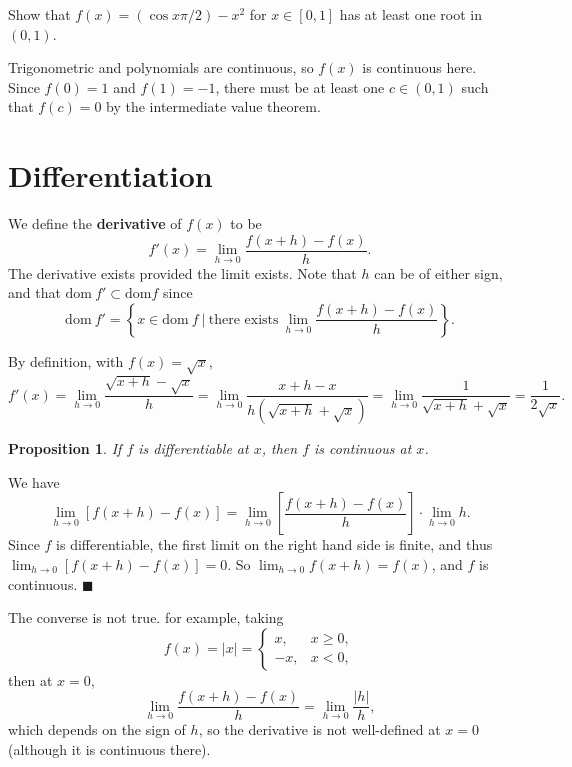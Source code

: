 \documentclass[letter-paper]{tufte-book}
\newtheorem{proposition}[theorem]{\color{pastel-blue}Proposition}
\newenvironment{proof}[1][Proof]{\begin{trivlist}
\item[\hskip \labelsep {\bfseries #1}]}{\end{trivlist}}
\newenvironment{example}[1][Example]{\begin{trivlist}
\item[\hskip \labelsep {\bfseries #1}]}{\end{trivlist}}
\newcommand\Def[1]{\textbf{#1}}
\newcommand{\qed}{\hfill$\blacksquare$}
\begin{document}
\begin{example}
  Show that $f(x)=(\cos x\pi/2) - x^2$ for $x\in[0,1]$ has at least one root in
  $(0,1)$.
  
  Trigonometric and polynomials are continuous, so $f(x)$ is continuous here.
  Since $f(0)=1$ and $f(1)=-1$, there must be at least one $c\in(0,1)$ such that
  $f(c)=0$ by the intermediate value theorem.
\end{example}


\section{Differentiation}

We define the \Def{derivative} of $f(x)$ to be
\begin{equation*}
  f'(x)=\lim_{h\to 0}\frac{f(x+h)-f(x)}{h}.
\end{equation*}
The derivative exists provided the limit exists. Note that $h$ can be of either
sign, and that $\mbox{dom}\ f'\subset \mbox{dom} f$ since
\begin{equation*}
  \mbox{dom}\ f'=\left\{x\in\mbox{dom}\ f\ |\ \mbox{there exists}\ 
  \lim_{h\to 0}\frac{f(x+h)-f(x)}{h}\right\}.
\end{equation*}
\begin{example}
  By definition, with $f(x)=\sqrt{x}$,
  \begin{equation*}
    f'(x)=\lim_{h\to 0}\frac{\sqrt{x+h}-\sqrt{x}}{h}=
    \lim_{h\to 0}\frac{x+h-x}{h(\sqrt{x+h}+\sqrt{x})}=
    \lim_{h\to 0}\frac{1}{\sqrt{x+h}+\sqrt{x}}=\frac{1}{2\sqrt{x}}.
  \end{equation*}
\end{example}

\begin{proposition}
  If $f$ is differentiable at $x$, then $f$ is continuous at $x$.
\end{proposition}
\begin{proof}
  We have
  \begin{equation*}
    \lim_{h\to 0}\left[f(x+h)-f(x)\right]=
    \lim_{h\to 0}\left[\frac{f(x+h)-f(x)}{h}\right]\cdot\lim_{h\to 0}h.
  \end{equation*}
  Since $f$ is differentiable, the first limit on the right hand side is finite,
  and thus $\lim_{h\to 0}[f(x+h)-f(x)]=0$. So $\lim_{h\to 0}f(x+h)=f(x)$, and
  $f$ is continuous. \qed
\end{proof}
The converse is not true. for example, taking
\begin{equation*}
  f(x)=|x|=\begin{cases}x, & x\geq 0,\\-x, & x<0, \end{cases}
\end{equation*}
then at $x=0$,
\begin{equation*}
  \lim_{h\to 0}\frac{f(x+h)-f(x)}{h}=\lim_{h\to 0}\frac{|h|}{h},
\end{equation*}
which depends on the sign of $h$, so the derivative is not well-defined at
$x=0$ (although it is continuous there).
\end{document}
